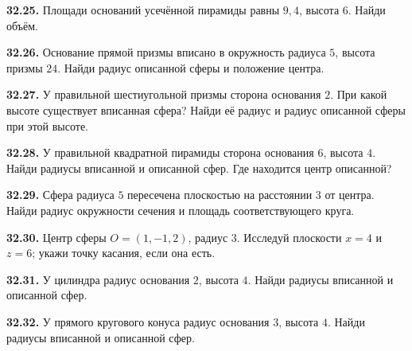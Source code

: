 \noindent\begin{minipage}[t]{\linewidth}\textbf{32.25.} Площади оснований усечённой пирамиды равны \(9,4\), высота \(6\). Найди объём.\par\end{minipage}\par
\noindent\begin{minipage}[t]{\linewidth}\textbf{32.26.} Основание прямой призмы вписано в окружность радиуса \(5\), высота призмы \(24\). Найди радиус описанной сферы и положение центра.\par\end{minipage}\par
\noindent\begin{minipage}[t]{\linewidth}\textbf{32.27.} У правильной шестиугольной призмы сторона основания \(2\). При какой высоте существует вписанная сфера? Найди её радиус и радиус описанной сферы при этой высоте.\par\end{minipage}\par
\noindent\begin{minipage}[t]{\linewidth}\textbf{32.28.} У правильной квадратной пирамиды сторона основания \(6\), высота \(4\). Найди радиусы вписанной и описанной сфер. Где находится центр описанной?\par\end{minipage}\par
\noindent\begin{minipage}[t]{\linewidth}\textbf{32.29.} Сфера радиуса \(5\) пересечена плоскостью на расстоянии \(3\) от центра. Найди радиус окружности сечения и площадь соответствующего круга.\par\end{minipage}\par
\noindent\begin{minipage}[t]{\linewidth}\textbf{32.30.} Центр сферы \(O=(1,-1,2)\), радиус \(3\). Исследуй плоскости \(x=4\) и \(z=6\); укажи точку касания, если она есть.\par\end{minipage}\par
\noindent\begin{minipage}[t]{\linewidth}\textbf{32.31.} У цилиндра радиус основания \(2\), высота \(4\). Найди радиусы вписанной и описанной сфер.\par\end{minipage}\par
\noindent\begin{minipage}[t]{\linewidth}\textbf{32.32.} У прямого кругового конуса радиус основания \(3\), высота \(4\). Найди радиусы вписанной и описанной сфер.\par\end{minipage}\par
